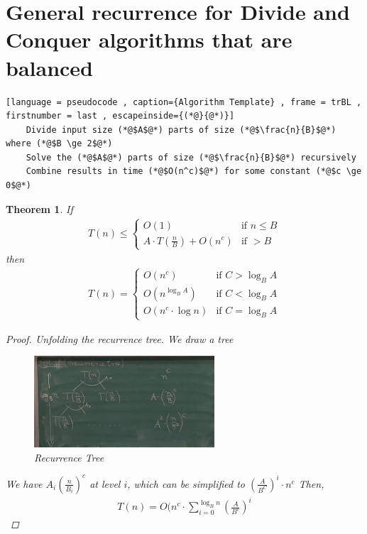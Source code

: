 \documentclass[a4paper]{article}
\theoremstyle{plain}
\newtheorem{thm}{Theorem}[section]
\theoremstyle{definition}
\theoremstyle{remark}
\begin{document}
	\section{General recurrence for Divide and Conquer algorithms that are balanced}
	\begin{lstlisting}[language = pseudocode , caption={Algorithm Template} , frame = trBL , firstnumber = last , escapeinside={(*@}{@*)}]
	Divide input size (*@$A$@*) parts of size (*@$\frac{n}{B}$@*) where (*@$B \ge 2$@*)
	Solve the (*@$A$@*) parts of size (*@$\frac{n}{B}$@*) recursively
	Combine results in time (*@$O(n^c)$@*) for some constant (*@$c \ge 0$@*)
	\end{lstlisting}
	\begin{thm} If
	\begin{align*}
		T(n)\le 
		\begin{cases}
			O(1) & \text{if } n \le B \\
			A \cdot T\left( \frac{n}{B} \right) + O(n^{c}) &\text{if } > B
		\end{cases}
	\end{align*}	
	then
	\begin{align*}
		T(n) =
		\begin{cases}
			O(n^{c}) & \text{if } C > \log_B A \\
			O(n^{\log_B A}) & \text{if } C < \log_B A\\
			O(n^{c} \cdot \log n) & \text{if }C= \log_B A
		\end{cases}
	\end{align*}
	\begin{proof}
		Unfolding the recurrence tree. We draw a tree
		\begin{figure}[H]
			\centering
			\includegraphics[width=0.6\textwidth]{tree.png}
			\caption{Recurrence Tree}
			\label{fig:tree-png}
		\end{figure}
		We have $A_i\left( \frac{n}{B_i} \right) ^{c}$ at level $i$, which can be simplified to $\left( \frac{A}{B^{C}} \right) ^{i}\cdot n^{c}$ Then,
		\begin{align*}
			T(n) = O(n^{c} \cdot \sum_{i=0}^{\log_B n} \left( \frac{A}{B^{c}} \right) ^{i}

\end{align*}
\end{proof}
\end{thm}
\end{document}
